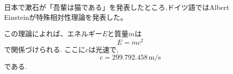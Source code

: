 \documentclass[a4paper,11pt]{jsarticle}
\begin{document}
日本で漱石が「吾輩は猫である」を発表したところ,ドイツ語ではAlbert Einsteinが特殊相対性理論を発表した。

この理論によれば、エネルギー$E$と質量$m$は
\begin{equation}
  E=mc^{2}
\end{equation}
で関係づけられる.
ここに$c$は光速で,
\begin{equation}
  c=299{.}792{.}458 \, \mathrm{m/s}
\end{equation}
である.
\end{document}
